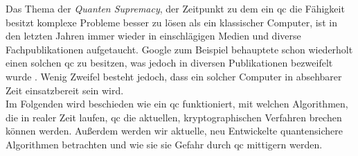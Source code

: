 Das Thema der \textit{Quanten Supremacy}, der Zeitpunkt zu dem ein \ac{qc} die Fähigkeit besitzt komplexe Probleme besser zu lösen als ein klassischer Computer, ist in den letzten Jahren immer wieder in einschlägigen Medien und diverse Fachpublikationen aufgetaucht. Google zum Beispiel behauptete schon wiederholt einen solchen \ac{qc} zu besitzen, was jedoch in diversen Publikationen bezweifelt wurde \cite{cho_ordinary_2022}. Wenig Zweifel besteht jedoch, dass ein solcher Computer in absehbarer Zeit einsatzbereit sein wird.\\ 
Im Folgenden wird beschieden wie ein \ac{qc} funktioniert, mit welchen Algorithmen, die in realer Zeit laufen, \ac{qc} die aktuellen, kryptographischen Verfahren brechen können werden. Außerdem werden wir aktuelle, neu Entwickelte quantensichere Algorithmen betrachten und wie sie sie Gefahr durch \ac{qc} mittigern werden.